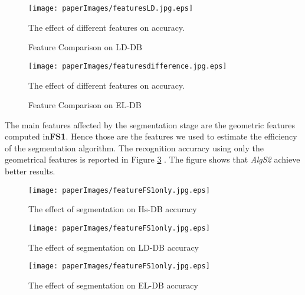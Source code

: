  \begin{figure}
	\centering
		\texttt{[image: paperImages/featuresLD.jpg.eps]}
	\caption{Feature Comparison on LD-DB} The effect of different features on accuracy.  %
	\label{fig:testFeaturesAll}
\end{figure}  

 \begin{figure}
	\centering
		\texttt{[image: paperImages/featuresdifference.jpg.eps]}
	\caption{Feature Comparison on EL-DB} The effect of different features on accuracy.  %
	\label{fig:testFeaturesAll}
\end{figure}  


 The main features affected by the segmentation stage are the geometric features computed in\textbf{FS1}. Hence those are the features we used to estimate the efficiency of the segmentation algorithm. The recognition accuracy using only the geometrical features is reported in Figure \ref{fig:testFeatonly} . The figure shows that \textsl{AlgS2} achieve better results.  %
 \begin{figure}
	\centering
		\texttt{[image: paperImages/featureFS1only.jpg.eps]}
	\caption{The effect of segmentation on Hs-DB accuracy} %
	\label{fig:testFeatonly}
\end{figure}  
 \begin{figure}
	\centering
		\texttt{[image: paperImages/featureFS1only.jpg.eps]}
	\caption{The effect of segmentation on LD-DB accuracy} %
	\label{fig:LDtestFeatonly}
\end{figure}  
 \begin{figure}
	\centering
		\texttt{[image: paperImages/featureFS1only.jpg.eps]}
	\caption{The effect of segmentation on EL-DB accuracy} %
	\label{fig:ELtestFeatonly}
\end{figure}  
